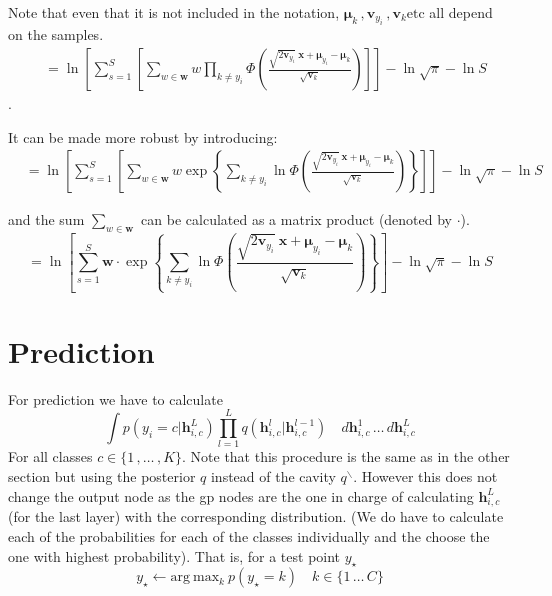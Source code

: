 \documentclass[]{article}
\newcommand{\mbf}[1]{\ensuremath{\mathbf{#1}}}
\begin{document}
Note that even that it is not included in the notation, $ \bm \mu_k \,, \mbf{v}_{y_i} \,, \mbf{v}_k \text{etc} $ all depend on the samples.
\begin{align}
&= \ln \left[ \sum_{s=1}^S \left[ \sum_{w \in \mbf{w}} w \prod_{k\neq y_i} \Phi \left( \frac{\sqrt{2\mbf{v}_{y_i}} \ \mbf{x} + \bm \mu_{y_i} - \bm \mu_k}{\sqrt{\mbf{v}_k}}  \right) \right]  \right] - \ln \sqrt{\pi} - \ln S \nonumber
\end{align}
.

It can be made more robust by introducing:
\begin{align}
&= \ln \left[ \sum_{s=1}^S \left[ \sum_{w \in \mbf{w}} w \exp\left\{ \sum_{k\neq y_i} \ln \Phi \left( \frac{\sqrt{2\mbf{v}_{y_i}} \ \mbf{x} + \bm \mu_{y_i} - \bm \mu_k}{\sqrt{\mbf{v}_k}}  \right) \right\} \right]  \right] - \ln \sqrt{\pi} - \ln S \nonumber
\end{align}

and the sum $ \sum_{w \in \mbf{w}} $ can be calculated as a matrix product (denoted by $\cdot$).
\begin{equation}
= \ln \left[ \sum_{s=1}^S  \mbf{w} \cdot \exp\left\{ \sum_{k\neq y_i} \ln \Phi \left( \frac{\sqrt{2\mbf{v}_{y_i}} \ \mbf{x} + \bm \mu_{y_i} - \bm \mu_k}{\sqrt{\mbf{v}_k}}  \right) \right\}   \right] - \ln \sqrt{\pi}- \ln S \nonumber
\end{equation}

\section{Prediction}
For prediction we have to calculate
\begin{equation}
\int p({y_i}=c | \mbf{h}_{i,c}^L) \prod_{l=1}^L q(\mbf{h}_{i,c}^l | \mbf{h}_{i,c}^{l-1}) \quad d\mbf{h}_{i,c}^1 \, \dots \, d\mbf{h}_{i,c}^L \nonumber
\end{equation}
For all classes $ c \in \{ 1\,, \dots \,, K \} $. Note that this procedure is the same as in the other section but using the posterior $ q $ instead of the cavity $ q^\backslash $. However this does not change the output node as the gp nodes are the one in charge of calculating $ \mbf{h}_{i,c}^L $  (for the last layer) with the corresponding distribution. (We do have to calculate each of the probabilities for each of the classes individually and the choose the one with highest probability). That is, for a test point $ y_\star $
\begin{equation}
y_\star \gets \text{arg} \ \text{max}_k \ p(y_\star=k) \quad  k \in \{1\, \dots \, C\} 
\end{equation}
\end{document}
